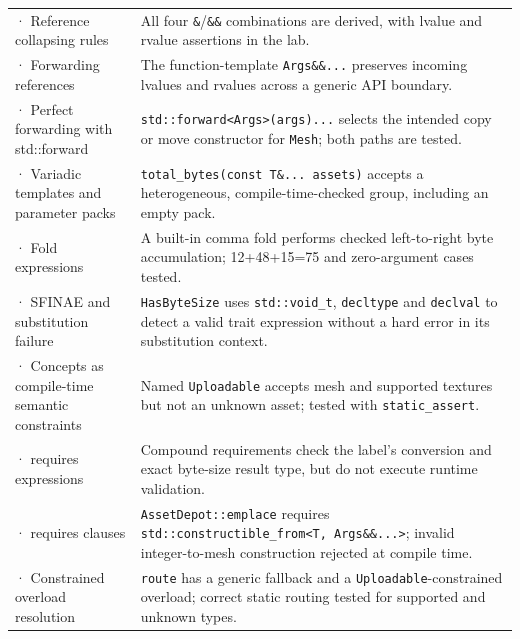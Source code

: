 {\begin{longtable}[]{@{}
  >{\raggedright\arraybackslash}p{}
  >{\raggedright\arraybackslash}p{}@{}}
207 · Reference collapsing rules & All four \texttt{\&}/\texttt{\&\&} combinations are derived, with lvalue and rvalue assertions in the lab. \\
208 · Forwarding references & The function-template \texttt{Args\&\&...} preserves incoming lvalues and rvalues across a generic API boundary. \\
209 · Perfect forwarding with std::forward & \texttt{std::forward\textless{}Args\textgreater{}(args)...} selects the intended copy or move constructor for \texttt{Mesh}; both paths are tested. \\
210 · Variadic templates and parameter packs & \texttt{total\_bytes(const\ T\&...\ assets)} accepts a heterogeneous, compile-time-checked group, including an empty pack. \\
211 · Fold expressions & A built-in comma fold performs checked left-to-right byte accumulation; 12+48+15=75 and zero-argument cases tested. \\
212 · SFINAE and substitution failure & \texttt{HasByteSize} uses \texttt{std::void\_t}, \texttt{decltype} and \texttt{declval} to detect a valid trait expression without a hard error in its substitution context. \\
213 · Concepts as compile-time semantic constraints & Named \texttt{Uploadable} accepts mesh and supported textures but not an unknown asset; tested with \texttt{static\_assert}. \\
214 · requires expressions & Compound requirements check the label's conversion and exact byte-size result type, but do not execute runtime validation. \\
215 · requires clauses & \texttt{AssetDepot::emplace} requires \texttt{std::constructible\_from\textless{}T,\ Args\&\&...\textgreater{}}; invalid integer-to-mesh construction rejected at compile time. \\
216 · Constrained overload resolution & \texttt{route} has a generic fallback and a \texttt{Uploadable}-constrained overload; correct static routing tested for supported and unknown types. \\
\end{longtable}
}

